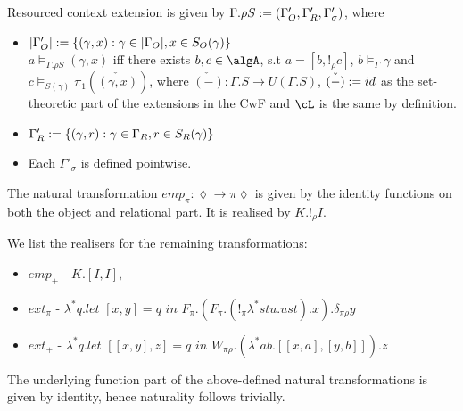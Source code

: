 \documentclass[12pt,a4paper]{article}
\renewcommand{\O}{_{O}}\alwaysmath{O}
\newcommand{\R}{\ensuremath{_{R}}}
\begin{document}
Resourced context extension is given by $\Gamma . \rho S \define (\Gamma'\O, \Gamma'\R, \Gamma'_\sigma)$, where
\begin{itemize}
  \item $|\Gamma'\O| \define \{(\gamma, x) : \gamma \in |\Gamma\O|, x \in S\O(\gamma) \}$\\
  $a \vDash_{\Gamma. \rho S} (\gamma, x)$ iff there exists $b, c \in \algA$, s.t $a = [b, !_\rho c]$, $b \vDash_{\Gamma} \gamma$ and $c \vDash_{S(\gamma)} \pi_1(\check{(\gamma, x)}) $, where $\check{(-)} : \Gamma . S \to U(\Gamma . S)$, $\check{(-)} := id$ as the set-theoretic part of the extensions in the CwF and $\cL$ is the same by definition.
  
  \item $\Gamma'\R \define \{(\gamma, r) : \gamma \in \Gamma\R, r \in S\R(\gamma)\}$ %
  
  \item Each $\Gamma'_\sigma$ is defined pointwise.
\end{itemize}
            
The natural transformation $emp_\pi : \lozenge \to \pi \lozenge$ is given by the identity functions on both the object and relational part. It is realised by $K . !_\rho I$.

We list the realisers for the remaining transformations:
\begin{itemize}[noitemsep]
  \item $emp_+$ - $K . [I, I]$,
  \item $ext_\pi$ -  $\lambda^* q. \textit{let }[x, y] = q\textit{ in } F_\pi . (F_\pi. (!_\pi \lambda^* s t u. u s t) . x) . \delta_{\pi \rho} y$ 
  \item $ext_+$ - $\lambda^* q. \textit{let } [[x , y], z] = q \textit{ in } W_{\pi\rho}.(\lambda^* a b. [[x, a],  [y, b]]).z$
\end{itemize}
The underlying function part of the above-defined natural transformations is given by identity, hence naturality follows trivially.\\
\end{document}
